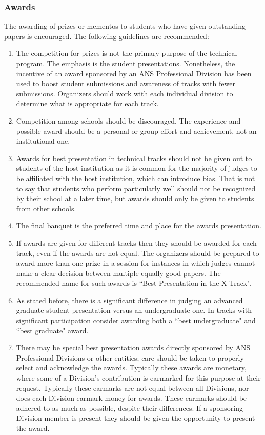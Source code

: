 \documentclass[12pt]{article}
\begin{document}
\subsubsection{Awards}
The awarding of prizes or mementos to students who have given outstanding papers is encouraged. The following guidelines are recommended:
\begin{enumerate}
    \item The competition for prizes is not the primary purpose of the technical program. The emphasis is the student presentations. Nonetheless, the incentive of an award sponsored by an ANS Professional Division has been used to boost student submissions and awareness of tracks with fewer submissions. Organizers should work with each individual division to determine what is appropriate for each track.
    \item Competition among schools should be discouraged. The experience and possible award should be a personal or group effort and achievement, not an institutional one.
    \item Awards for best presentation in technical tracks should not be given out to students of the host institution as it is common for the majority of judges to be affiliated with the host institution, which can introduce bias. That is not to say that students who perform particularly well should not be recognized by their school at a later time, but awards should only be given to students from other schools.
    \item The final banquet is the preferred time and place for the awards presentation.
    \item If awards are given for different tracks then they should be awarded for each track, even if the awards are not equal. The organizers should be prepared to award more than one prize in a session for instances in which judges cannot make a clear decision between multiple equally good papers. The recommended name for such awards is ``Best Presentation in the X Track".
    \item As stated before, there is a significant difference in judging an advanced graduate student presentation versus an undergraduate one. In tracks with significant participation consider awarding both a ``best undergraduate" and ``best graduate" award. 
    \item There may be special best presentation awards directly sponsored by ANS Professional Divisions or other entities; care should be taken to properly select and acknowledge the awards. Typically these awards are monetary, where some of a Division's contribution is earmarked for this purpose at their request. Typically these earmarks are not equal between all Divisions, nor does each Division earmark money for awards. These earmarks should be adhered to as much as possible, despite their differences. If a sponsoring Division member is present they should be given the opportunity to present the award.

\end{enumerate}
\end{document}
